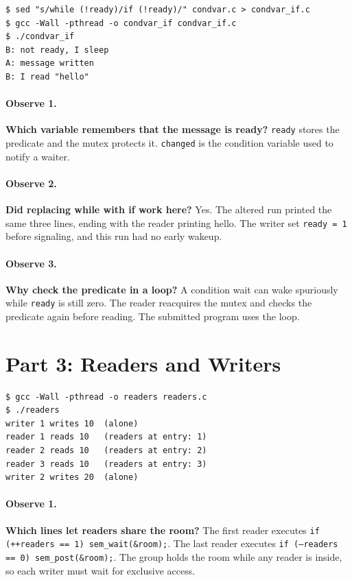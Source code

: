 \documentclass[12pt,a4paper]{article}
\begin{document}
\begin{lstlisting}[caption={Single predicate check in the altered run}]
$ sed "s/while (!ready)/if (!ready)/" condvar.c > condvar_if.c
$ gcc -Wall -pthread -o condvar_if condvar_if.c
$ ./condvar_if
B: not ready, I sleep
A: message written
B: I read "hello"
\end{lstlisting}

\paragraph{Observe 1.} \textbf{Which variable remembers that the message is ready?} \texttt{ready} stores the predicate and the mutex protects it. \texttt{changed} is the condition variable used to notify a waiter.

\paragraph{Observe 2.} \textbf{Did replacing while with if work here?} Yes. The altered run printed the same three lines, ending with the reader printing hello. The writer set \texttt{ready = 1} before signaling, and this run had no early wakeup.

\paragraph{Observe 3.} \textbf{Why check the predicate in a loop?} A condition wait can wake spuriously while \texttt{ready} is still zero. The reader reacquires the mutex and checks the predicate again before reading. The submitted program uses the loop.

\section{Part 3: Readers and Writers}

\begin{lstlisting}[caption={Concurrent readers between exclusive writers}]
$ gcc -Wall -pthread -o readers readers.c
$ ./readers
writer 1 writes 10  (alone)
reader 1 reads 10   (readers at entry: 1)
reader 2 reads 10   (readers at entry: 2)
reader 3 reads 10   (readers at entry: 3)
writer 2 writes 20  (alone)
\end{lstlisting}

\paragraph{Observe 1.} \textbf{Which lines let readers share the room?} The first reader executes \texttt{if (++readers == 1) sem\_wait(\&room);}. The last reader executes \texttt{if (--readers == 0) sem\_post(\&room);}. The group holds the room while any reader is inside, so each writer must wait for exclusive access.
\end{document}
